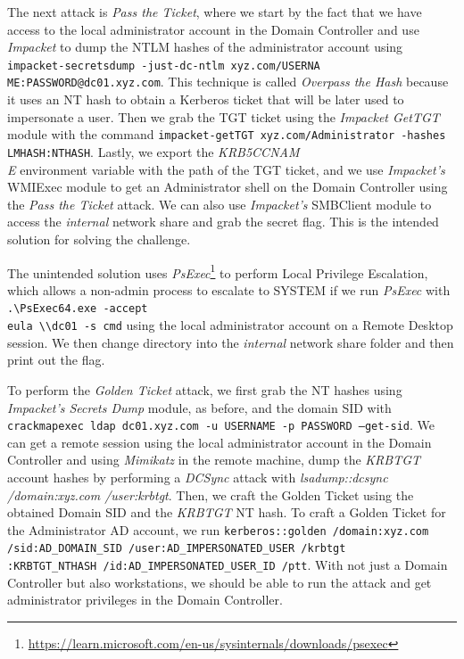 The next attack is \textit{Pass the Ticket}, where we start by the fact that we have access to the local administrator account in the Domain Controller and use \textit{Impacket} to dump the NTLM hashes of the administrator account using \texttt{impacket-secretsdump -just-dc-ntlm xyz.com/USERNA\\ME:PASSWORD@dc01.xyz.com}. This technique is called \textit{Overpass the Hash} because it uses an NT hash to obtain a Kerberos ticket that will be later used to impersonate a user. Then we grab the TGT ticket using the \textit{Impacket GetTGT} module with the command \texttt{impacket-getTGT xyz.com/Administrator -hashes  LMHASH:NTHASH}. Lastly, we export the \textit{KRB5CCNAM\\E} environment variable with the path of the TGT ticket, and we use \textit{Impacket's} WMIExec module to get an Administrator shell on the Domain Controller using the \textit{Pass the Ticket} attack. We can also use \textit{Impacket's} SMBClient module to access the \textit{internal} network share and grab the secret flag. This is the intended solution for solving the challenge.

The unintended solution uses \textit{PsExec}\footnote{\url{https://learn.microsoft.com/en-us/sysinternals/downloads/psexec}} to perform Local Privilege Escalation, which allows a non-admin process to escalate to SYSTEM if we run \textit{PsExec} with \texttt{.\textbackslash PsExec64.exe -accept\\eula \textbackslash\textbackslash dc01 -s cmd} using the local administrator account on a Remote Desktop session. We then change directory into the \textit{internal} network share folder and then print out the flag.

To perform the \textit{Golden Ticket} attack, we first grab the NT hashes using \textit{Impacket's Secrets Dump} module, as before, and the domain SID with \texttt{crackmapexec ldap dc01.xyz.com -u USERNAME -p PASSWORD ---get-sid}. We can get a remote session using the local administrator account in the Domain Controller and using \textit{Mimikatz} in the remote machine, dump the \textit{KRBTGT} account hashes by performing a \textit{DCSync} attack with \textit{lsadump::dcsync /domain:xyz.com /user:krbtgt}. Then, we craft the Golden Ticket using the obtained Domain SID and the \textit{KRBTGT} NT hash. To craft a Golden Ticket for the Administrator AD account, we run \texttt{kerberos::golden /domain:xyz.com /sid:AD\_DOMAIN\_SID /user:AD\_IMPERSONATED\_USER /krbtgt\\:KRBTGT\_NTHASH /id:AD\_IMPERSONATED\_USER\_ID /ptt}. With not just a Domain Controller but also workstations, we should be able to run the attack and get administrator privileges in the Domain Controller.


